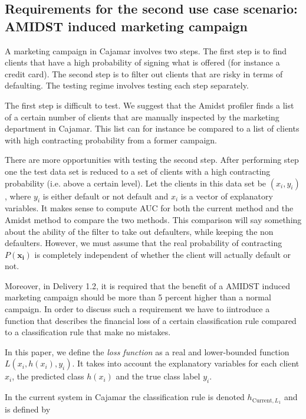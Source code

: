 \documentclass{article}
\theoremstyle{theorem}
\theoremstyle{definition}
\newcommand{\bv}[1]{\bm{#1}}
\begin{document}
{\subsection{Requirements for the second use case scenario:  AMIDST induced marketing campaign}

A marketing campaign in Cajamar involves two steps.  The first step is to find clients that have a high probability of signing what is offered (for instance a credit card).  The second step is to filter out clients that are risky in terms of defaulting.
The testing regime involves testing each step separately.

The first step is difficult to test. We suggest that the Amidst profiler finds a list of a certain number of clients that are manually inspected by the marketing department in Cajamar. This list can for instance be compared to a list of clients with high contracting probability from a former campaign.

There are more opportunities with testing the second step.  After performing step one the test data set is reduced to a set of clients with a high contracting probability (i.e. above a certain level).  Let the clients in this data set be $(x_i, y_i)$, where $y_i$ is either default or not default and $x_i$ is a vector of explanatory variables.  It makes sense to compute AUC for both the current method and the Amidst method to compare the two methods.  This comparison will say something about the ability of the filter to take out defaulters, while keeping the non defaulters.  However, we must assume that the real probability of contracting $P(\bv{x_i})$ is completely independent of whether the client will actually default or not.

Moreover, in Delivery 1.2, it is required that the benefit of a AMIDST induced marketing campaign should be more than 5 percent higher than a normal campaign.  In order to discuss such a requirement we have to iintroduce a function that describes the financial loss of a certain classification rule compared to a classification rule that make no mistakes. 

In this paper, we define the \emph{loss function} as a real and lower-bounded function $L(x_i, h(x_i), y_i)$. It takes into account the explanatory variables for each client $x_i$, the predicted class $h(x_i)$ and the true class label $y_i$. 

In the current system in Cajamar the classification rule is denoted $h_{\mbox{Current},L_1}$ and is defined by

}
\end{document}
